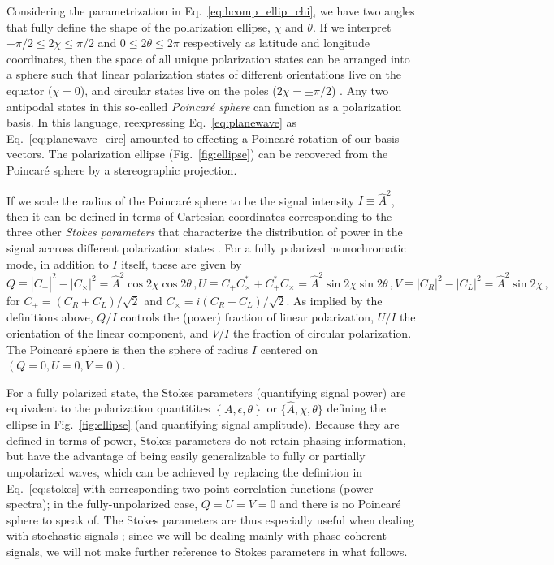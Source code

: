 \documentclass[aps,prd,twocolumn,superscriptaddress,preprintnumbers,floatfix,nofootinbib]{revtex4-2}
\newcommand{\beq}{\begin{equation}}
\newcommand{\eeq}{\end{equation}}
\newcommand*{\eq}[1]{Eq.~\eqref{eq:#1}}
\begin{document}
Considering the parametrization in \eq{hcomp_ellip_chi}, we have two angles that fully define the shape of the polarization ellipse, $\chi$ and $\theta$.
If we interpret $-\pi/2 \leq 2\chi \leq \pi/2$ and $0 \leq 2\theta \leq 2\pi$ respectively as latitude and longitude coordinates, then the space of all unique polarization states can be arranged into a sphere such that linear polarization states of different orientations live on the equator ($\chi = 0$), and circular states live on the poles ($2\chi = \pm \pi/2$) \cite{poincare,goldstein}.
Any two antipodal states in this so-called \emph{Poincar\'e sphere} can function as a polarization basis.
In this language, reexpressing Eq.~\eqref{eq:planewave} as Eq.~\eqref{eq:planewave_circ} amounted to effecting a Poincar\'{e} rotation of our basis vectors.
The polarization ellipse (Fig.~\ref{fig:ellipse}) can be recovered from the Poincar\'e sphere by a stereographic projection.

If we scale the radius of the Poincar\'{e} sphere to be the signal intensity $I \equiv \hat{A}^2$, then it can be defined in terms of Cartesian coordinates corresponding to the three other \emph{Stokes parameters} that characterize the distribution of power in the signal accross different polarization states \cite{Anile1974}.
For a fully polarized monochromatic mode, in addition to $I$ itself, these are given by
\begin{subequations} \label{eq:stokes}
\beq
Q \equiv |C_+|^2 - |C_\times|^2 = \hat{A}^2 \cos 2\chi \cos 2\theta \, , 
\eeq
\beq
U \equiv C_+ C_\times^* + C_+^* C_\times = \hat{A}^2 \sin2\chi \sin 2\theta \,  ,
\eeq
\beq
V \equiv |C_R|^2 - |C_L|^2 = \hat{A}^2 \sin 2\chi \, ,
\eeq 
\end{subequations}
for $C_+ = (C_R + C_L)/\sqrt{2}$ and $C_\times = i (C_R - C_L)/\sqrt{2}$.
As implied by the definitions above, $Q/I$ controls the (power) fraction of linear polarization, $U/I$ the orientation of the linear component, and $V/I$ the fraction of circular polarization.
The Poincar\'{e} sphere is then the sphere of radius $I$ centered on $\left(Q=0, U=0, V=0\right)$.

For a fully polarized state, the Stokes parameters (quantifying signal power) are equivalent to the polarization quantitites $\left\{A, \epsilon, \theta\right\}$ or $\{\hat{A}, \chi, \theta\}$ defining the ellipse in Fig.~\ref{fig:ellipse} (and quantifying signal amplitude).
Because they are defined in terms of power, Stokes parameters do not retain phasing information, but have the advantage of being easily generalizable to fully or partially unpolarized waves, which can be achieved by replacing the definition in Eq.~\eqref{eq:stokes} with corresponding two-point correlation functions (power spectra); in the fully-unpolarized case, $Q=U=V=0$ and there is no Poincar\'{e} sphere to speak of.
The Stokes parameters are thus especially useful when dealing with stochastic signals \cite{Romano:2016dpx,Conneely:2018wis,Seto:2008sr,Kato:2015bye}; since we will be dealing mainly with phase-coherent signals, we will not make further reference to Stokes parameters in what follows.
\end{document}
